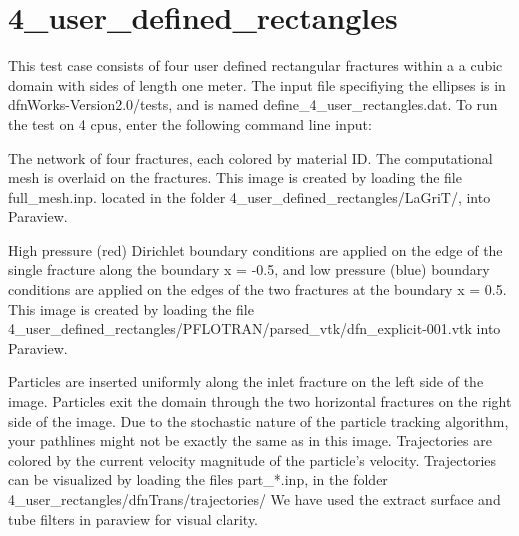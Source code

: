 \documentclass[letterpaper,10pt,english]{sphinxmanual}
\begin{document}
\section{4\_user\_defined\_rectangles}
\label{\detokenize{tutorial:user-defined-rectangles}}
This test case consists of four user defined rectangular fractures within a a cubic domain with sides of length one meter. The input file specifiying the ellipses is in dfnWorks-Version2.0/tests, and is named define\_4\_user\_rectangles.dat. To run the test on 4 cpus, enter the following command line input:

The network of four fractures, each colored by material ID. The computational mesh is overlaid on the fractures. This image is created by loading the file full\_mesh.inp. located in the folder 4\_user\_defined\_rectangles/LaGriT/, into Paraview.
\begin{figure}[htbp]
\centering
\capstart

\noindent{}
\caption{}\label{\detokenize{tutorial:id1}}\end{figure}

High pressure (red) Dirichlet boundary conditions are applied on the edge of the single fracture along the boundary x = -0.5, and low pressure (blue) boundary conditions are applied on the edges of the two fractures at the boundary x = 0.5.
This image is created by loading the file 4\_user\_defined\_rectangles/PFLOTRAN/parsed\_vtk/dfn\_explicit-001.vtk into Paraview.
\begin{figure}[htbp]
\centering
\capstart

\noindent{}
\caption{}\label{\detokenize{tutorial:id2}}\end{figure}

Particles are inserted uniformly along the inlet fracture on the left side of the image.
Particles exit the domain through the two horizontal fractures on the right side of the image.
Due to the stochastic nature of the particle tracking algorithm, your pathlines might not be exactly the same as in this image.
Trajectories are colored by the current velocity magnitude of the particle's velocity.
Trajectories can be visualized by loading the files part\_*.inp, in the folder 4\_user\_rectangles/dfnTrans/trajectories/
We have used the extract surface and tube filters in paraview for visual clarity.
\begin{figure}[htbp]
\centering
\capstart

\noindent{}
\caption{}\label{\detokenize{tutorial:id3}}\end{figure}
\end{document}
